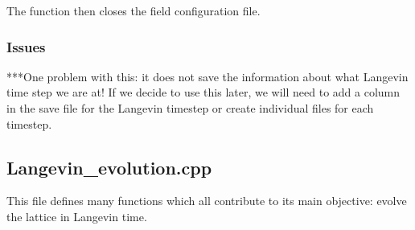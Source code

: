 \documentclass[../../RotatingBosons.tex]{subfiles}
\begin{document}
The function then closes the field configuration file.

\subsubsection{Issues}
***One problem with this: it does not save the information about what Langevin time step we are at! If we decide to use this later, we will need to add a column in the save file for the Langevin timestep or create individual files for each timestep.
 
\subsection{\label{aartsLangevinevolution}Langevin\_evolution.cpp}
This file defines many functions which all contribute to its main objective: evolve the lattice in Langevin time.
\end{document}
